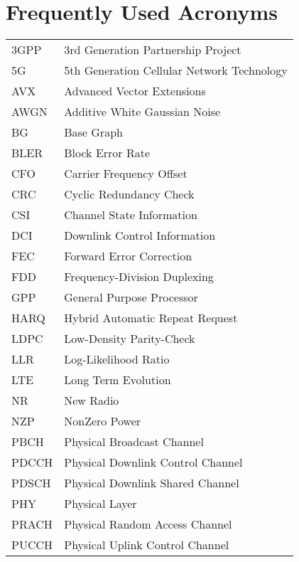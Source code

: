 \chapter{Frequently Used Acronyms}
\hypertarget{acronyms}{}\label{acronyms}
\tabulinesep=1mm
\begin{longtabu}spread 0pt [c]{*{2}{|X[-1]}|}
\hline
3GPP  &3rd Generation Partnership Project   \\
5G  &5th Generation Cellular Network Technology   \\
AVX  &Advanced Vector Extensions   \\
AWGN  &Additive White Gaussian Noise   \\
BG  &Base Graph   \\
BLER  &Block Error Rate   \\
CFO  &Carrier Frequency Offset   \\
CRC  &Cyclic Redundancy Check   \\
CSI  &Channel State Information   \\
DCI  &Downlink Control Information   \\
FEC  &Forward Error Correction   \\
FDD  &Frequency-\/\+Division Duplexing   \\
GPP  &General Purpose Processor   \\
HARQ  &Hybrid Automatic Repeat Request   \\
LDPC  &Low-\/\+Density Parity-\/\+Check   \\
LLR  &Log-\/\+Likelihood Ratio   \\
LTE  &Long Term Evolution   \\
NR  &New Radio   \\
NZP  &Non\+Zero Power   \\
PBCH  &Physical Broadcast Channel   \\
PDCCH  &Physical Downlink Control Channel   \\
PDSCH  &Physical Downlink Shared Channel   \\
PHY  &Physical Layer   \\
PRACH  &Physical Random Access Channel   \\
PUCCH  &Physical Uplink Control Channel   \\

\end{longtabu}
